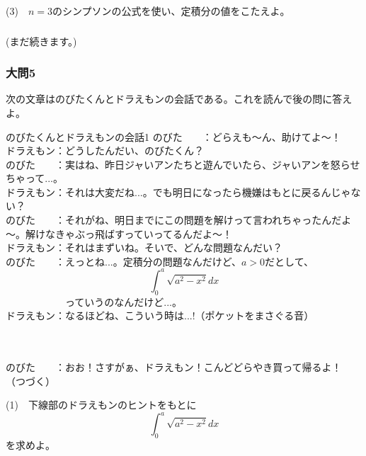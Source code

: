 \documentclass[a4j,dvipdfmx]{jsarticle}
\begin{document}
    (3)　$n=3$のシンプソンの公式を使い、定積分の値をこたえよ。

    \subsubsection*{}
    (まだ続きます。)
    \newpage
    \subsubsection*{大問5}
    次の文章はのびたくんとドラえもンの会話である。これを読んで後の問に答えよ。
    \begin{itembox}[c]{のびたくんとドラえもンの会話1}
        のびた　　：どらえも～ん、助けてよ～！\\
        ドラえもン：どうしたんだい、のびたくん？\\
        のびた　　：実はね、昨日ジャいアンたちと遊んでいたら、ジャいアンを怒らせちゃって...。\\
        ドラえもン：それは大変だね...。でも明日になったら機嫌はもとに戻るんじゃない？\\
        のびた　　：それがね、明日までにこの問題を解けって言われちゃったんだよ～。解けなきゃぶっ飛ばすっていってるんだよ～！\\
        ドラえもン：それはまずいね。そいで、どんな問題なんだい？\\
        のびた　　：えっとね...。定積分の問題なんだけど、$a>0$だとして、
        \begin{equation*}
            \int_0^a\sqrt{a^2-x^2}dx
        \end{equation*}
        　　　　　　っていうのなんだけど...。\\
        ドラえもン：なるほどね、こういう時は...!（ポケットをまさぐる音）\\\\
        \centerline{}\\

        のびた　　：おお！さすがぁ、ドラえもン！こんどどらやき買って帰るよ！
        （つづく）
    \end{itembox}
    (1)　下線部のドラえもンのヒントをもとに
    \begin{equation*}
        \int_0^a\sqrt{a^2-x^2}dx
    \end{equation*}
    を求めよ。
\end{document}
